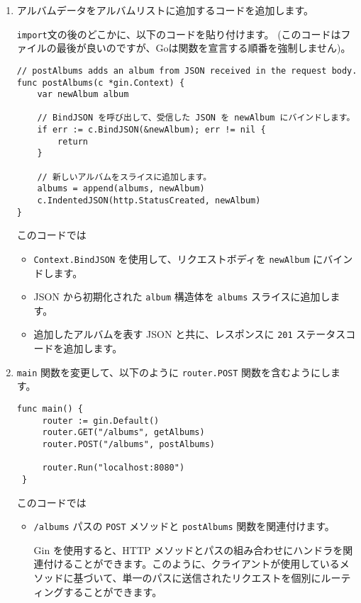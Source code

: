 \begin{enumerate}
\item
  アルバムデータをアルバムリストに追加するコードを追加します。

  \texttt{import}文の後のどこかに、以下のコードを貼り付けます。
  (このコードはファイルの最後が良いのですが、Goは関数を宣言する順番を強制しません)。


\begin{lstlisting}[numbers=none]
// postAlbums adds an album from JSON received in the request body.
func postAlbums(c *gin.Context) {
    var newAlbum album

    // BindJSON を呼び出して、受信した JSON を newAlbum にバインドします。
    if err := c.BindJSON(&newAlbum); err != nil {
        return
    }

    // 新しいアルバムをスライスに追加します。
    albums = append(albums, newAlbum)
    c.IndentedJSON(http.StatusCreated, newAlbum)
}
\end{lstlisting}

  このコードでは

  \begin{itemize}
  \item
    \texttt{Context.BindJSON} を使用して、リクエストボディを
    \texttt{newAlbum} にバインドします。
  \item
    JSON から初期化された \texttt{album} 構造体を \texttt{albums}
    スライスに追加します。
  \item
    追加したアルバムを表す JSON と共に、レスポンスに \texttt{201}
    ステータスコードを追加します。
  \end{itemize}
\item
  \texttt{main} 関数を変更して、以下のように \texttt{router.POST}
  関数を含むようにします。

\begin{lstlisting}[numbers=none]
 func main() {
     router := gin.Default()
     router.GET("/albums", getAlbums)
     router.POST("/albums", postAlbums)

     router.Run("localhost:8080")
 }
\end{lstlisting}

  このコードでは

  \begin{itemize}
  \item
    \texttt{/albums} パスの \texttt{POST} メソッドと \texttt{postAlbums}
    関数を関連付けます。

    Gin を使用すると、HTTP
    メソッドとパスの組み合わせにハンドラを関連付けることができます。このように、クライアントが使用しているメソッドに基づいて、単一のパスに送信されたリクエストを個別にルーティングすることができます。
  \end{itemize}
\end{enumerate}

